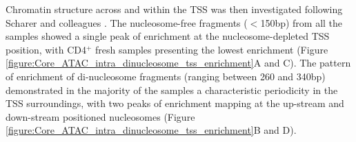 Chromatin structure across and within the TSS was then investigated following Scharer and colleagues \parencite{Scharer2016}. The nucleosome-free fragments ($<$150bp) from all the samples showed a single peak of enrichment at the nucleosome-depleted TSS position, with CD4$^+$ fresh samples presenting the lowest enrichment (Figure \ref{figure:Core_ATAC_intra_dinucleosome_tss_enrichment}A and C). The pattern of enrichment of di-nucleosome fragments (ranging between 260 and 340bp) demonstrated in the majority of the samples a characteristic periodicity in the TSS surroundings, with two peaks of enrichment mapping at the up-stream and down-stream positioned nucleosomes (Figure \ref{figure:Core_ATAC_intra_dinucleosome_tss_enrichment}B and D). 




